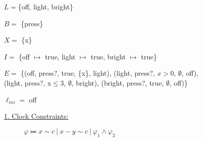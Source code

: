\begin{tcolorbox}[colback=kapiteleins!5!white, colframe=orange!75!black, title=\textbf{Timed Automaton $\mathcal{A} = (L, B, X, I, E, \ell_{ini})$ \hfill Edges $E=$ ($\ell$, $\alpha$, $\varphi$, $Y$, $\ell'$)}, left=0mm, right=0mm, top=0mm, bottom=0mm]
\begin{description}[leftmargin=2.25cm, labelwidth=1.5cm]
\item [Locations:] $L =$\{off, light, bright\}
\item[Alphabet:] $B =$ \{press\}
\item[Clocks:] $X =$ \{x\}
\item[Invariants:] $I =$ \{off $\mapsto$ true, light $\mapsto$ true, bright $\mapsto$ true\}
\item[Edges:] $E =$ \{(off, press?, true, \{x\}, light), (light, press?, $x>0$, $\emptyset$, off),\\(light, press?, x$\leq$3, $\emptyset$, bright), (bright, press?, true, $\emptyset$, off)\}
\item[Inital location:] $\ell_{ini} = $ off
\end{description}

\begin{description}
\item[\uline{1. Clock Constraints:}] $\varphi \Coloneqq x \sim c~|~x - y \sim c~|~\varphi_1 \land \varphi_2$


\end{description}
\end{tcolorbox}

